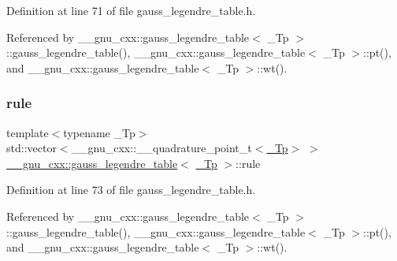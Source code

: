 Definition at line 71 of file gauss\+\_\+legendre\+\_\+table.\+h.



Referenced by \+\_\+\+\_\+gnu\+\_\+cxx\+::gauss\+\_\+legendre\+\_\+table$<$ \+\_\+\+Tp $>$\+::gauss\+\_\+legendre\+\_\+table(), \+\_\+\+\_\+gnu\+\_\+cxx\+::gauss\+\_\+legendre\+\_\+table$<$ \+\_\+\+Tp $>$\+::pt(), and \+\_\+\+\_\+gnu\+\_\+cxx\+::gauss\+\_\+legendre\+\_\+table$<$ \+\_\+\+Tp $>$\+::wt().

\mbox{\label{struct____gnu__cxx_1_1gauss__legendre__table_a1c1f6c907f2bcee143c39136679901b4}} 
\subsubsection{\texorpdfstring{rule}{rule}}
{\footnotesize\ttfamily template$<$typename \+\_\+\+Tp$>$ \\
std\+::vector$<$\+\_\+\+\_\+gnu\+\_\+cxx\+::\+\_\+\+\_\+quadrature\+\_\+point\+\_\+t$<$\hyperlink{namespace____gnu__cxx_a3b19a9c800ca194374ef9172290f7d79}{\+\_\+\+Tp}$>$ $>$ \hyperlink{struct____gnu__cxx_1_1gauss__legendre__table}{\+\_\+\+\_\+gnu\+\_\+cxx\+::gauss\+\_\+legendre\+\_\+table}$<$ \hyperlink{namespace____gnu__cxx_a3b19a9c800ca194374ef9172290f7d79}{\+\_\+\+Tp} $>$\+::rule}



Definition at line 73 of file gauss\+\_\+legendre\+\_\+table.\+h.



Referenced by \+\_\+\+\_\+gnu\+\_\+cxx\+::gauss\+\_\+legendre\+\_\+table$<$ \+\_\+\+Tp $>$\+::gauss\+\_\+legendre\+\_\+table(), \+\_\+\+\_\+gnu\+\_\+cxx\+::gauss\+\_\+legendre\+\_\+table$<$ \+\_\+\+Tp $>$\+::pt(), and \+\_\+\+\_\+gnu\+\_\+cxx\+::gauss\+\_\+legendre\+\_\+table$<$ \+\_\+\+Tp $>$\+::wt().

\mbox{\label{struct____gnu__cxx_1_1gauss__legendre__table_a4bc3bb73288637899d2eb459eb751607}} 
